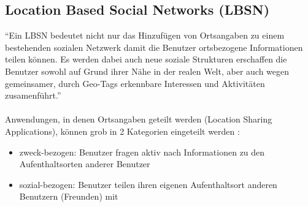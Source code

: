 \subsection{Location Based Social Networks (LBSN)}\label{3_LBSN}
"`Ein LBSN bedeutet nicht nur das Hinzufügen von Ortsangaben zu einem bestehenden sozialen Netzwerk damit die Benutzer ortsbezogene Informationen teilen können. Es werden dabei auch neue soziale Strukturen erschaffen die Benutzer sowohl auf Grund ihrer Nähe in der realen Welt, aber auch wegen gemeinsamer, durch Geo-Tags erkennbare Interessen und Aktivitäten zusamenführt."'\cite{ZHENG:LBSNTUT}\\ \\
Anwendungen, in denen Ortsangaben geteilt werden (Location Sharing Applications), können grob in 2 Kategorien
eingeteilt werden \cite{LINETAL:4SQ}:
\begin{itemize}[leftmargin=*,noitemsep,topsep=1ex,parsep=0pt,partopsep=0pt]
\item zweck-bezogen: Benutzer fragen aktiv nach Informationen zu den Aufenthaltsorten anderer Benutzer
\item sozial-bezogen: Benutzer teilen ihren eigenen Aufenthaltsort anderen Benutzern (Freunden) mit
\end{itemize}

